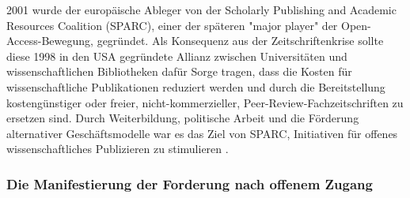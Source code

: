 2001 wurde der europäische Ableger von der Scholarly Publishing and Academic Resources Coalition (SPARC), einer der späteren "major player" der Open-Access-Bewegung, \cite{russell2008business} \cite{Herb_2012} gegründet. Als Konsequenz aus der Zeitschriftenkrise sollte diese 1998 in den USA gegründete Allianz zwischen Universitäten und wissenschaftlichen Bibliotheken dafür Sorge tragen, dass die Kosten für wissenschaftliche Publikationen reduziert werden und durch die Bereitstellung kostengünstiger oder freier, nicht-kommerzieller, Peer-Review-Fachzeitschriften zu ersetzen sind. Durch Weiterbildung, politische Arbeit und die Förderung alternativer Geschäftsmodelle war es das Ziel von SPARC, Initiativen für offenes wissenschaftliches Publizieren zu stimulieren \cite{sparc_2015}.

\subsubsection{Die Manifestierung der Forderung nach offenem Zugang}

